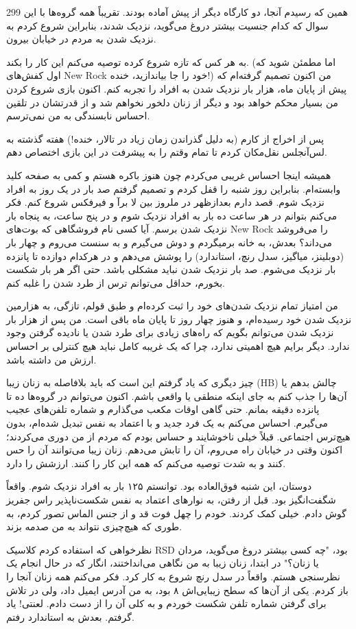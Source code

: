 299  
همین که رسیدم آنجا، دو کارگاه دیگر از پیش آماده بودند. تقریباً همه گروه‌ها با این سوال که کدام جنسیت بیشتر دروغ می‌گوید، نزدیک شدند، بنابراین شروع کردم به نزدیک شدن به مردم در خیابان بیرون.

به هر کس که تازه شروع کرده توصیه می‌کنم این کار را بکند. (اما مطمئن شوید که اول کفش‌های New Rock خود را جا بیاندازید، خنده!) من اکنون تصمیم گرفته‌ام که پیش از پایان ماه، هزار بار نزدیک شدن به افراد را تجربه کنم. اکنون بازی شروع کردن من بسیار محکم خواهد بود و دیگر از زنان دلخور نخواهم شد و از قدرتشان در تلقین احساس نابسندگی به من نمی‌ترسم.

پس از اخراج از کارم (به دلیل گذراندن زمان زیاد در تالار، خنده!) هفته گذشته به لس‌آنجلس نقل‌مکان کردم تا تمام وقتم را به پیشرفت در این بازی اختصاص دهم.  

همیشه اینجا احساس غریبی می‌کردم چون هنوز باکره هستم و کمی به صفحه کلید وابسته‌ام. بنابراین روز شنبه را قفل کردم و تصمیم گرفتم صد بار در یک روز به افراد نزدیک شوم. قصد دارم بعدازظهر در ملروز بین لا برآ و فیر‌فکس شروع کنم. فکر می‌کنم بتوانم در هر ساعت ده بار به افراد نزدیک شوم و در پنج ساعت، به پنجاه بار نزدیک شدن برسم. آیا کسی نام فروشگاهی که بوت‌های New Rock را می‌فروشد می‌داند؟ بعدش، به خانه برمیگردم و دوش می‌گیرم و به سنست می‌روم و چهار بار (دوبلینز، میاگیز، سدل رنچ، استاندارد) را پوشش می‌دهم و در هرکدام دوازده تا پانزده بار نزدیک می‌شوم. صد بار نزدیک شدن نباید مشکلی باشد. حتی اگر هر بار شکست بخورم، حداقل می‌توانم ترس از طرد شدن را غلبه کنم.

من امتیاز تمام نزدیک شدن‌های خود را ثبت کرده‌ام و طبق قولم، تازگی، به هزارمین نزدیک شدن خود رسیده‌ام، و هنوز چهار روز تا پایان ماه باقی است. من پس از هزار بار نزدیک شدن می‌توانم بگویم که راه‌های زیادی برای طرد شدن یا نادیده گرفتن وجود ندارد. دیگر برایم هیچ اهمیتی ندارد، چرا که یک غریبه کامل نباید هیچ کنترلی بر احساس ارزش من داشته باشد.

چیز دیگری که یاد گرفتم این است که باید بلافاصله به زنان زیبا (HB) چالش بدهم یا آن‌ها را جذب کنم به جای اینکه منطقی یا واقعی باشم. اکنون می‌توانم در گروه‌ها ده تا پانزده دقیقه بمانم. حتی گاهی اوقات مکعب می‌گذارم و شماره تلفن‌های عجیب می‌گیرم. احساس می‌کنم به یک فرد جدید و با اعتماد به نفس تبدیل شده‌ام، بدون هیچ‌ترس اجتماعی. قبلاً خیلی ناخوشایند و حساس بودم که مردم از من دوری می‌کردند؛ اکنون وقتی در خیابان راه می‌روم، آن را تابش می‌دهم. زنان زیبا می‌توانند آن را حس کنند و به شدت توصیه می‌کنم که همه این کار را کنند. ارزشش را دارد.

دوستان، این شنبه فوق‌العاده بود. توانستم ۱۲۵ بار به افراد نزدیک شوم. واقعاً شگفت‌انگیز بود. قبل از رفتن، به نوارهای اعتماد به نفس شکست‌ناپذیر راس جفریز گوش دادم. خیلی کمک کردند. خودم را چهل فوت قد و از جنس الماس تصور کردم، به طوری که هیچ‌چیزی نتواند به من صدمه بزند.

نظرخواهی که استفاده کردم کلاسیک RSD بود، "چه کسی بیشتر دروغ می‌گوید، مردان یا زنان؟" در ابتدا، زنان زیبا به من نگاهی می‌انداختند، انگار که در حال انجام یک نظرسنجی هستم. واقعاً در سدل رنچ شروع به کار کرد. فکر می‌کنم همه زنان آنجا را باز کردم. یکی از آن‌ها که سطح زیبایی‌اش ۸ بود، به من آدرس ایمیل داد، ولی در تلاش برای گرفتن شماره تلفن شکست خوردم و به کلی آن را از دست دادم. لعنتی! یاد گرفتم. بعدش به استاندارد رفتم.